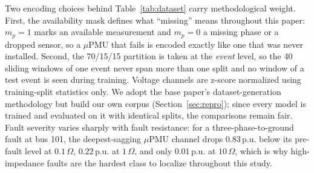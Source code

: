 \documentclass[3p,times,procedia]{elsarticle}
\begin{document}
Two encoding choices behind Table~\ref{tab:dataset} carry methodological weight. First, the availability mask defines what ``missing'' means throughout this paper: $m_p=1$ marks an available measurement and $m_p=0$ a missing phase or a dropped sensor, so a $\mu$PMU that fails is encoded exactly like one that was never installed. Second, the 70/15/15 partition is taken at the \emph{event} level, so the 40 sliding windows of one event never span more than one split and no window of a test event is seen during training. Voltage channels are z-score normalized using training-split statistics only. We adopt the base paper's dataset-generation methodology but build our own corpus (Section~\ref{sec:repro}); since every model is trained and evaluated on it with identical splits, the comparisons remain fair. Fault severity varies sharply with fault resistance: for a three-phase-to-ground fault at bus 101, the deepest-sagging $\mu$PMU channel drops $0.83$\,p.u. below its pre-fault level at $0.1\,\Omega$, $0.22$\,p.u. at $1\,\Omega$, and only $0.01$\,p.u. at $10\,\Omega$, which is why high-impedance faults are the hardest class to localize throughout this study.
\end{document}
